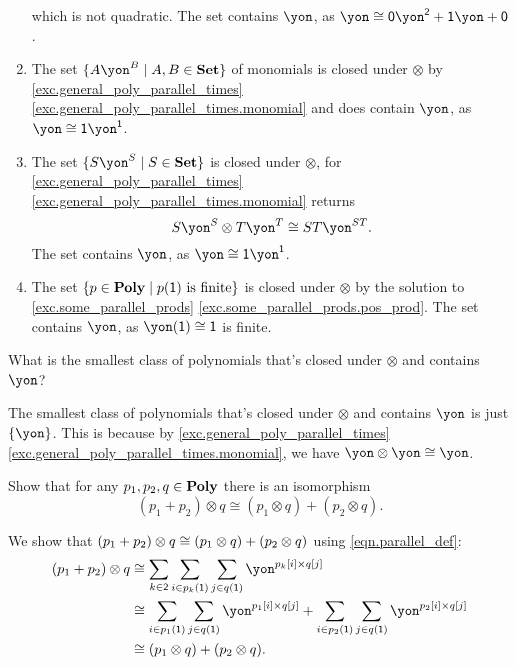 \documentclass[Book-Poly]{subfiles}
\begin{document}
\begin{exercise}
\begin{solution}
\begin{enumerate}
\[	\]
	which is not quadratic.
	The set contains $\yon$, as $\yon \iso \0\yon^\2 + \1\yon + \0$.
	\item The set $\{A\yon^B\mid A,B\in\smset\}$ of monomials is closed under $\otimes$ by \cref{exc.general_poly_parallel_times} \cref{exc.general_poly_parallel_times.monomial} and does contain $\yon$, as $\yon \iso \1\yon^\1$.
	\item The set $\{S\yon^S\mid S\in\smset\}$ is closed under $\otimes$, for \cref{exc.general_poly_parallel_times} \cref{exc.general_poly_parallel_times.monomial} returns
	\[
	    S\yon^S \otimes T\yon^T \iso ST\yon^{ST}.
	\]
	The set contains $\yon$, as $\yon \iso \1\yon^\1$.
	\item The set $\{p\in\mathbf{Poly}\mid p(\textsf{1})\text{ is finite}\}$ is closed under $\otimes$ by the solution to \cref{exc.some_parallel_prods} \cref{exc.some_parallel_prods.pos_prod}.
	The set contains $\yon$, as $\yon(\1) \iso \1$ is finite.
\end{enumerate}
\end{solution}
\end{exercise}

\begin{exercise}
What is the smallest class of polynomials that's closed under $\otimes$ and contains $\yon$?
\begin{solution}
The smallest class of polynomials that's closed under $\otimes$ and contains $\yon$ is just $\{\yon\}$.
This is because by \cref{exc.general_poly_parallel_times} \cref{exc.general_poly_parallel_times.monomial}, we have $\yon \otimes \yon \iso \yon$.
\end{solution}
\end{exercise}

\begin{exercise}
Show that for any $p_1,p_2,q\in\mathbf{Poly}$ there is an isomorphism
\[
(p_1+p_2)\otimes q\cong (p_1\otimes q)+(p_2\otimes q).
\]
\begin{solution}
We show that $(p_1 + p_2) \otimes q \cong (p_1 \otimes q) + (p_2 \otimes q)$ using \eqref{eqn.parallel_def}:
\begin{align*}
    (p_1 + p_2) \otimes q &\iso \sum_{k \in \2} \sum_{i \in p_k(\1)} \sum_{j \in q(\1)} \yon^{p_k[i] \times q[j]} \\
    &\iso \sum_{i \in p_1(\1)} \sum_{j \in q(\1)} \yon^{p_1[i] \times q[j]} + \sum_{i \in p_2(\1)} \sum_{j \in q(\1)} \yon^{p_2[i] \times q[j]} \\
    &\iso (p_1 \otimes q) + (p_2 \otimes q).
\end{align*}
\end{solution}
\end{exercise}
\end{document}
